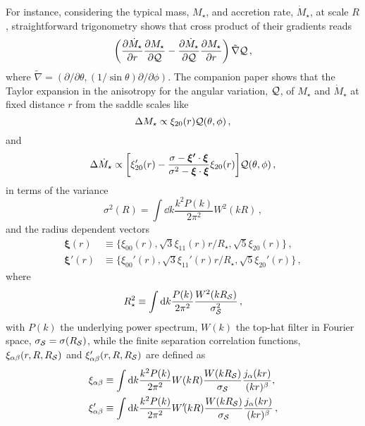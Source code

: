 \documentclass[useAMS,usenatbib]{mnras}
\begin{document}
For instance, considering the typical mass, $M_\star$, and accretion rate, ${\dot M}_\star$, at scale $R$, straightforward trigonometry shows that cross product of their gradients reads
\begin{equation}
  \left(\frac{\partial  \dot M_\star}{\partial r} \frac{\partial
      M_\star }{\partial {\cal Q}}-\frac{\partial  \dot M_\star}{\partial {\cal Q}} \frac{\partial M_\star }{\partial r}\right) {\tilde \nabla}{\cal Q} \,,\label{eq:crossprod}
\end{equation}
where  
$
\tilde \nabla=\left({\partial}/{\partial \theta} ,
({1}/{\sin \theta}){\partial}/{\partial \phi} \right)
$.
%
The companion paper  \citep{biaspaper} shows that the Taylor expansion in the anisotropy for the angular variation, $\cal Q$, of $M_\star$  and  $\dot M_\star$  at fixed distance
$r$ from the saddle scales like
\begin{equation} 
\Delta M_\star\propto \xi_{20}(r) {\cal Q}(\theta,\phi)\,,  \label{eq:defDeltaM} 
\end{equation}
and 
\begin{equation}
  \Delta \dot M_\star \propto
    \bigg[\xi_{20}'(r)- \frac{\sigma-\boldsymbol{\xi'}\cdot \boldsymbol{\xi}}{\sigma^2-\boldsymbol{\xi}\cdot \boldsymbol{\xi}}\xi_{20}(r)\bigg]
 {\cal Q}(\theta,\phi)\,, \label{eq:defDeltaDotM} 
 \end{equation}
in terms of the  variance
\begin{equation}
  \sigma^2(R) =
  \int\dd k \frac{k^2P(k)}{2\pi^2} W^2(kR)\,, \label{eq:sigma2}
\end{equation}
 and the radius dependent vectors 
\begin{align}
  \boldsymbol{\xi}(r) &\equiv
  \{\xi_{00}(r),\sqrt{3}\xi_{11}(r)r/R_\star,\sqrt{5}\xi_{20}(r)\}
\label{eq:xisad}\,, \\
  \boldsymbol{\xi}'\!(r) &\equiv
  \{\xi_{00}'(r),\sqrt{3}\xi_{11}'(r)r/R_\star,\sqrt{5}\xi_{20}'(r)\}\,,
\label{eq:xi'sad}
\end{align}
where 
\begin{equation}
  R^2_\star \equiv
  \int\dd k \frac{P(k)}{2\pi^2} \frac{W^2(k\Rs)}{\sigmas^2}\,,
\label{eq:sadscale}
\end{equation}
with $P(k)$ the underlying power spectrum, $W(k)$ the top-hat filter in Fourier space, $\sigma_\S=\sigma(R_\S)$, while  the  finite separation correlation
functions, $\xi_{\alpha\beta}(r, R, \Rs)$ and $\xi'_{\alpha\beta}(r, R, \Rs)$ are defined as
\begin{align}
\label{eq:xi_xi}
   \xi_{\alpha\beta} &\equiv \int \dd k \frac{k^2P(k)}{2\pi^2}
  W(kR)\frac{W(k\Rs)}{\sigmas}
  \frac{j_\alpha(kr)}{(kr)^\beta}, \\ %
  \xi'_{\alpha\beta} & \equiv
  \int \dd k \frac{k^2P(k)}{2\pi^2} W'\!(kR)
  \frac{W(k\Rs)}{\sigmas}\frac{j_\alpha(kr)}{(kr)^\beta}\,,
  \label{eq:xi_xiprime}
\end{align}
\end{document}
